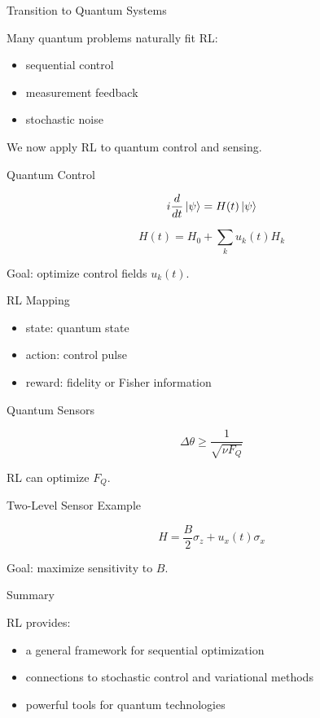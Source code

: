 \documentclass{beamer}
\begin{document}
\begin{frame}{Transition to Quantum Systems}

Many quantum problems naturally fit RL:

\begin{itemize}
\item sequential control
\item measurement feedback
\item stochastic noise
\end{itemize}

We now apply RL to quantum control and sensing.

\end{frame}


\begin{frame}{Quantum Control}

\[
i \frac{d}{dt}\ket{\psi} = H(t)\ket{\psi}
\]

\[
H(t)=H_0 + \sum_k u_k(t) H_k
\]

Goal: optimize control fields $u_k(t)$.

\end{frame}

\begin{frame}{RL Mapping}

\begin{itemize}
\item state: quantum state
\item action: control pulse
\item reward: fidelity or Fisher information
\end{itemize}

\end{frame}

\begin{frame}{Quantum Sensors}

\[
\Delta \theta \ge \frac{1}{\sqrt{\nu F_Q}}
\]

RL can optimize $F_Q$.

\end{frame}

\begin{frame}{Two-Level Sensor Example}

\[
H = \frac{B}{2}\sigma_z + u_x(t)\sigma_x
\]

Goal: maximize sensitivity to $B$.

\end{frame}

\begin{frame}{Summary}

RL provides:

\begin{itemize}
\item a general framework for sequential optimization
\item connections to stochastic control and variational methods
\item powerful tools for quantum technologies
\end{itemize}

\end{frame}
\end{document}
